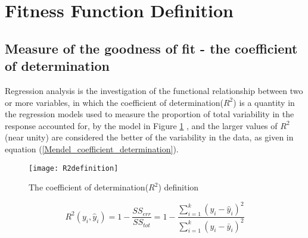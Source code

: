 


\section{Fitness Function Definition}
\label{Fitness Function Design}


\subsection{Measure of the goodness of fit - the coefficient of determination}
\label{R_sq}

Regression analysis is the investigation of the functional
relationship between two or more variables, in which the coefficient
of determination($R^2$) is a quantity in the regression models used
to measure the proportion of total variability in the response
accounted for, by the model in Figure \ref{R2definition}
\cite{Gujarati2004,Montgomery2003}, and the larger values of
$R^2$(near unity) are considered the better of the variability in
the data, as given in equation
(\ref{Mendel_coefficient_determination}).


\begin{figure}[h!]
\centering
\texttt{[image: R2definition]}
\caption{The coefficient of determination($R^2$) definition
\cite{Gujarati2004,Montgomery2003}} \label{R2definition}
\end{figure}

\begin{equation}
R^2 \left( y_i,\hat{y}_i \right) = 1 -  \frac{SS_{err}}{SS_{tot}} =
1 - \frac{\sum\limits_{i = 1}^k{ \left( y_i - \hat{y}_i
\right)^2}}{\sum\limits_{i = 1}^k{ \left( y_i - \bar{y}_i
\right)^2}}
\label{Mendel_coefficient_determination}
\end{equation}


